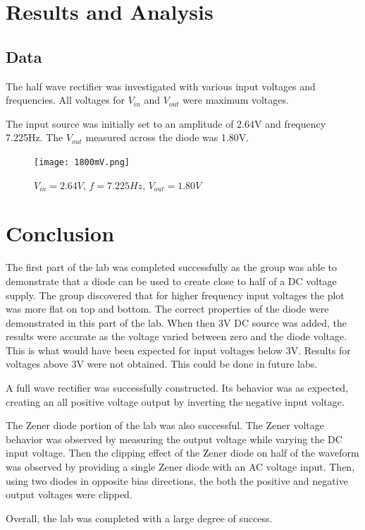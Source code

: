 \documentclass[twocolumn, amsmath]{revtex4}
\begin{document}
\section{Results and Analysis}

\subsection{Data}
The half wave rectifier was investigated with various input voltages and frequencies. All voltages for $V_{in}$ and $V_{out}$ were maximum voltages.

The input source was initially set to an amplitude of 2.64V and frequency 7.225Hz. The $V_{out}$ measured across the diode was 1.80V.

\begin{figure}[h]
    \texttt{[image: 1800mV.png]}  
    \caption{$V_{in}= 2.64V$, $f=7.225Hz$, $V_{out} = 1.80V$}
\end{figure}




\section{Conclusion}
The first part of the lab was completed successfully as the group was able to demonstrate that a diode can be used to create close to half of a DC voltage supply. The group discovered that for higher frequency input voltages the plot was more flat on top and bottom. The correct properties of the diode were demonstrated in this part of the lab. When then 3V DC source was added, the results were accurate as the voltage varied between zero and the diode voltage. This is what would have been expected for input voltages below 3V. Results for voltages above 3V were not obtained. This could be done in future labs.

A full wave rectifier was successfully constructed. Its behavior was as expected, creating an all positive voltage output by inverting the negative input voltage. 

The Zener diode portion of the lab was also successful. The Zener voltage behavior was observed by measuring the output voltage while varying the DC input voltage. Then the clipping effect of the Zener diode on half of the waveform was observed by providing a single Zener diode with an AC voltage input. Then, using two diodes in opposite bias directions, the both the positive and negative output voltages were clipped.

Overall, the lab was completed with a large degree of success.
\end{document}
